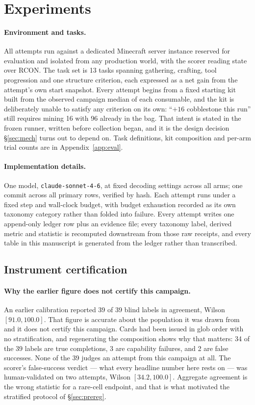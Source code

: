 \documentclass[11pt]{article}
\newcommand{\runin}[1]{\paragraph{#1}}
\begin{document}
\section{Experiments}
\label{sec:exp}

\runin{Environment and tasks.}
All attempts run against a dedicated Minecraft server instance reserved
for evaluation and isolated from any production world, with the scorer
reading state over RCON. The task set is 13 tasks spanning gathering,
crafting, tool progression and one structure criterion, each expressed
as a net gain from the attempt's own start snapshot. Every attempt
begins from a fixed starting kit built from the observed campaign median
of each consumable, and the kit is deliberately unable to satisfy any
criterion on its own: ``$+16$ cobblestone this run'' still requires
mining 16 with 96 already in the bag. That intent is stated in the
frozen runner, written before collection began, and it is the design
decision \S\ref{sec:mech} turns out to depend on. Task definitions, kit
composition and per-arm trial counts are in Appendix~\ref{app:eval}.

\runin{Implementation details.}
One model, \texttt{claude-sonnet-4-6}, at fixed decoding settings across
all arms; one commit across all \NPrimary{} primary rows, verified by
hash. Each attempt runs under a fixed step and wall-clock budget, with
budget exhaustion recorded as its own taxonomy category rather than
folded into failure. Every attempt writes one append-only ledger row
plus an evidence file; every taxonomy label, derived metric and
statistic is recomputed downstream from those raw receipts, and every
table in this manuscript is generated from the ledger rather than
transcribed.

\subsection{Instrument certification}
\label{sec:calib}

\runin{Why the earlier figure does not certify this campaign.}
An earlier calibration reported 39 of 39 blind labels in agreement,
Wilson $[91.0, 100.0]$. That figure is accurate about the population it
was drawn from and it does not certify this campaign. Cards had been
issued in glob order with no stratification, and regenerating the
composition shows why that matters: 34 of the 39 labels are true
completions, 3 are capability failures, and 2 are false successes. None
of the 39 judges an attempt from this campaign at all. The scorer's
false-success verdict --- what every headline number here rests on ---
was human-validated on two attempts, Wilson $[34.2, 100.0]$. Aggregate
agreement is the wrong statistic for a rare-cell endpoint, and that is
what motivated the stratified protocol of \S\ref{sec:prereg}.
\end{document}
